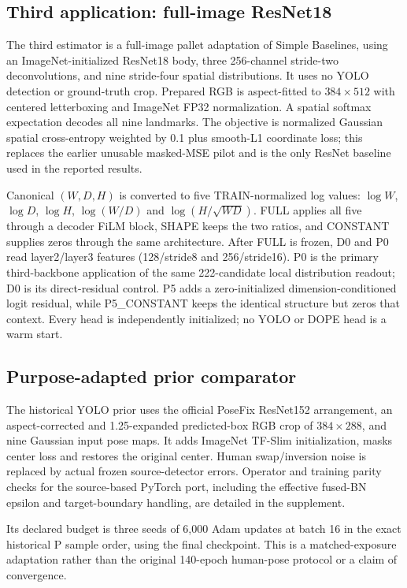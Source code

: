 \documentclass[journal]{IEEEtran}
\begin{document}
\subsection{Third application: full-image ResNet18}
The third estimator is a full-image pallet adaptation of Simple Baselines\cite{simplebaseline}, using an ImageNet-initialized ResNet18 body, three 256-channel stride-two deconvolutions, and nine stride-four spatial distributions. It uses no YOLO detection or ground-truth crop. Prepared RGB is aspect-fitted to $384\times512$ with centered letterboxing and ImageNet FP32 normalization. A spatial softmax expectation decodes all nine landmarks. The objective is normalized Gaussian spatial cross-entropy weighted by 0.1 plus smooth-L1 coordinate loss; this replaces the earlier unusable masked-MSE pilot and is the only ResNet baseline used in the reported results.

Canonical $(W,D,H)$ is converted to five TRAIN-normalized log values: $\log W$, $\log D$, $\log H$, $\log(W/D)$ and $\log(H/\sqrt{WD})$. FULL applies all five through a decoder FiLM block, SHAPE keeps the two ratios, and CONSTANT supplies zeros through the same architecture. \ResnetBaselineStatus{} After FULL is frozen, D0 and P0 read layer2/layer3 features (128/stride8 and 256/stride16). P0 is the primary third-backbone application of the same 222-candidate local distribution readout; D0 is its direct-residual control. P5 adds a zero-initialized dimension-conditioned logit residual, while P5\_CONSTANT keeps the identical structure but zeros that context. Every head is independently initialized; no YOLO or DOPE head is a warm start.

\subsection{Purpose-adapted prior comparator}
The historical YOLO prior uses the official PoseFix ResNet152 arrangement, an aspect-corrected and 1.25-expanded predicted-box RGB crop of $384\times288$, and nine Gaussian input pose maps. It adds ImageNet TF-Slim initialization, masks center loss and restores the original center. Human swap/inversion noise is replaced by actual frozen source-detector errors. Operator and training parity checks for the source-based PyTorch port, including the effective fused-BN epsilon and target-boundary handling, are detailed in the supplement.

Its declared budget is three seeds of 6,000 Adam updates at batch 16 in the exact historical P sample order, using the final checkpoint. This is a matched-exposure adaptation rather than the original 140-epoch human-pose protocol or a claim of convergence. \PriorTrainingStatus{}
\end{document}
